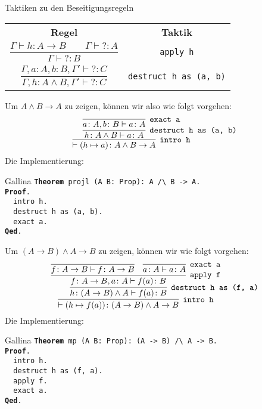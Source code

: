\documentclass[8pt]{beamer}
\newcommand{\strong}[1]{\textsf{\textbf{#1}}}
\newcommand{\cond}{\rightarrow}
\newcommand{\kw}[1]{\textbf{#1}}
\newcommand{\unres}{{?}}
\begin{document}
\begin{frame}
\begin{block}{Taktiken zu den Beseitigungsregeln}
\begin{center}
\begin{tabular}{c@{\qquad\quad}c}
\strong{Regel} & \strong{Taktik}\\[6pt]
$\dfrac{\Gamma\vdash h\colon A\to B\qquad\Gamma\vdash\unres\colon A}{\Gamma\vdash\unres\colon B}$
& \texttt{apply h}\\[14pt]
$\dfrac{\Gamma,a\colon A,b\colon B,\Gamma'\vdash\unres\colon C}
  {\Gamma,h\colon A\land B,\Gamma'\vdash\unres\colon C}$
& \texttt{destruct h as (a, b)}
\end{tabular}
\end{center}
\end{block}
\end{frame}

\begin{frame}
Um $A\land B\cond A$ zu zeigen, können wir also wie folgt vorgehen:
\[\infer[\texttt{intro h}]{\vdash (h\mapsto a)\colon A\land B\cond A}{
  \infer[\texttt{destruct h as (a, b)}]{h\colon A\land B\vdash a\colon A}{
    \infer[\texttt{exact a}]{a\colon A, b\colon B\vdash a\colon A}{}
  }
}\]\pause
Die Implementierung:
\begin{block}{Gallina}
\texttt{\kw{Theorem} projl (A B: Prop): A /{\textbackslash} B -> A.\\
\kw{Proof}.\\
\ \ intro h.\\
\ \ destruct h as (a, b).\\
\ \ exact a.\\
\kw{Qed}.}
\end{block}
\end{frame}

\begin{frame}
Um $(A\cond B)\land A\cond B$ zu zeigen, können wir wie folgt vorgehen:
\[\infer[\texttt{intro h}]{\vdash (h\mapsto f(a))\colon (A\to B)\land A\to B}{
  \infer[\texttt{destruct h as (f, a)}]{h\colon (A\to B)\land A\vdash f(a)\colon B}{
    \infer[\texttt{apply f}]{f\colon A\to B, a\colon A\vdash f(a)\colon B}{
      \infer{f\colon A\to B\vdash f\colon A\to B}{}
    & \infer[\texttt{exact a}]{a\colon A\vdash a\colon A}{}
    }
  }
}\]\pause
Die Implementierung:
\begin{block}{Gallina}
\texttt{\kw{Theorem} mp (A B: Prop): (A -> B) /{\textbackslash} A -> B.\\
\kw{Proof}.\\
\ \ intro h.\\
\ \ destruct h as (f, a).\\
\ \ apply f.\\
\ \ exact a.\\
\kw{Qed}.}
\end{block}
\end{frame}
\end{document}
